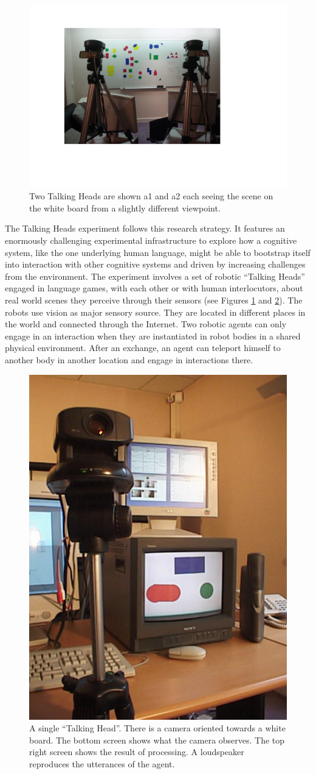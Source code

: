 \begin{figure}[htbp]
  \centerline{\includegraphics[width=.65\textwidth]{./chap1/figs/heads.pdf}}
\caption{Two Talking Heads are shown {\bfshape a1} and 
{\bfshape a2} each seeing the scene on the white board from a slightly different viewpoint.}
\label{f:plate1}
\end{figure}

The Talking Heads experiment follows this research strategy. 
It features an enormously challenging experimental
infrastructure to explore how a cognitive
system, like the one underlying human language, might
be able to bootstrap itself into interaction 
with other cognitive systems and driven by increasing
challenges from the environment. The experiment
involves a set of robotic ``Talking Heads'' engaged in language
games, with each other or with human interlocutors, 
about real world scenes they perceive through their sensors
(see Figures \ref{f:plate1} and \ref{f:plate2}).
The robots use vision as major sensory source. They are located in
different places in the world and connected through the Internet. 
Two robotic agents can only engage in an interaction when they 
are instantiated in robot bodies in a shared physical environment. 
After an exchange, an agent can teleport himself to another body in 
another location and engage in interactions there. 


\begin{figure}[htbp]
  \centerline{\includegraphics[width=.40\textwidth]{./chap1/figs/head.pdf}}
\caption{A single ``Talking Head''. There is a camera oriented towards a
white board. The bottom screen shows what the camera observes. The top right screen shows the result of processing.
A loudspeaker reproduces the utterances of the agent. }
\label{f:plate2}
\end{figure}

